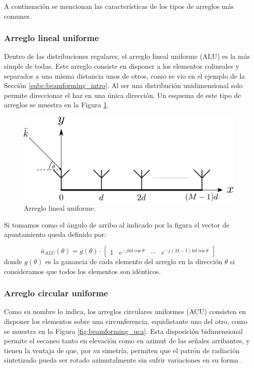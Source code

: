 A continuación se mencionan las características de los tipos de arreglos más comunes.

\subsubsection{Arreglo lineal uniforme}

Dentro de las distribuciones regulares, el arreglo lineal uniforme (ALU) es la más simple de todas. Este arreglo consiste en disponer a los elementos colineales y separados a una misma distancia unos de otros, como se vio en el ejemplo de la Sección \ref{subc:beamforming_intro}. Al ser una distribución unidimensional solo permite direccionar el haz en una única dirección. Un esquema de este tipo de arreglos se muestra en la Figura \ref{fig:beamforming_ula}.

\begin{figure}[ht]
    \centering
    \includegraphics[width=0.7\linewidth]{images/02-Beamforming/ula.png}
    \caption{Arreglo lineal uniforme.}
    \label{fig:beamforming_ula}
\end{figure}

Si tomamos como el ángulo de arribo al indicado por la figura el vector de apuntamiento queda definido por:

\begin{equation}
    \bar{a}_{ALU}(\theta) = g(\theta) \cdot \begin{bmatrix}
        1 & e^{-jkd\cos \theta} & \cdots & e^{-j(M-1)kd \cos \theta}
    \end{bmatrix}
\end{equation}
donde $g(\theta)$ es la ganancia de cada elemento del arreglo en la dirección $\theta$ si consideramos que todos los elementos son idénticos.

\subsubsection{Arreglo circular uniforme}

Como su nombre lo indica, los arreglos circulares uniformes (ACU) consisten en disponer los elementos sobre una circunferencia, equidistante uno del otro, como se muestra en la Figura \ref{fig:beamforming_uca}. Esta disposición bidimensional permite el escaneo tanto en elevación como en azimut de las señales arribantes, y tienen la ventaja de que, por su simetría, permiten que el patrón de radiación sintetizado pueda ser rotado azimutalmente sin sufrir variaciones en su forma \cite{Ucasmartantennas_p193}.


